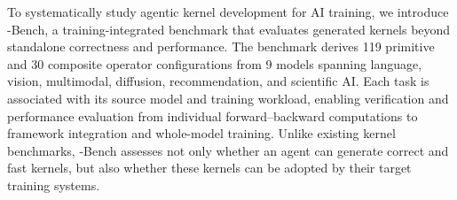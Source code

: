 

To systematically study agentic kernel development for AI training, we introduce \method-Bench, a training-integrated benchmark that evaluates generated kernels beyond standalone correctness and performance. The benchmark derives 119 primitive and 30 composite operator configurations from 9 models spanning language, vision, multimodal, diffusion, recommendation, and scientific AI. Each task is associated with its source model and training workload, enabling verification and performance evaluation from individual forward--backward computations to framework integration and whole-model training. Unlike existing kernel benchmarks, \method-Bench assesses not only whether an agent can generate correct and fast kernels, but also whether these kernels can be adopted by their target training systems.


